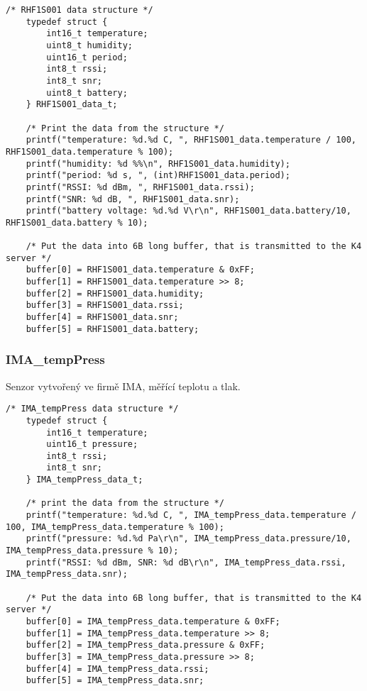 \begin{lstlisting}[style=CStyle]
    /* RHF1S001 data structure */   
    typedef struct {
        int16_t temperature;
        uint8_t humidity;
        uint16_t period;
        int8_t rssi;
        int8_t snr;
        uint8_t battery;
    } RHF1S001_data_t;

    /* Print the data from the structure */
	printf("temperature: %d.%d C, ", RHF1S001_data.temperature / 100, RHF1S001_data.temperature % 100);
	printf("humidity: %d %%\n", RHF1S001_data.humidity);
	printf("period: %d s, ", (int)RHF1S001_data.period);
	printf("RSSI: %d dBm, ", RHF1S001_data.rssi);
	printf("SNR: %d dB, ", RHF1S001_data.snr);
	printf("battery voltage: %d.%d V\r\n", RHF1S001_data.battery/10, RHF1S001_data.battery % 10);

    /* Put the data into 6B long buffer, that is transmitted to the K4 server */
	buffer[0] = RHF1S001_data.temperature & 0xFF;
	buffer[1] = RHF1S001_data.temperature >> 8;
	buffer[2] = RHF1S001_data.humidity;
	buffer[3] = RHF1S001_data.rssi;
	buffer[4] = RHF1S001_data.snr;
	buffer[5] = RHF1S001_data.battery;
\end{lstlisting}


\subsubsection{IMA\_tempPress}
Senzor vytvořený ve firmě IMA, měřící teplotu a tlak.

\begin{lstlisting}[style=CStyle]
    /* IMA_tempPress data structure */   
    typedef struct {
        int16_t temperature;
        uint16_t pressure;
        int8_t rssi;
        int8_t snr;
    } IMA_tempPress_data_t;
    
    /* print the data from the structure */
	printf("temperature: %d.%d C, ", IMA_tempPress_data.temperature / 100, IMA_tempPress_data.temperature % 100);
	printf("pressure: %d.%d Pa\r\n", IMA_tempPress_data.pressure/10, IMA_tempPress_data.pressure % 10);
	printf("RSSI: %d dBm, SNR: %d dB\r\n", IMA_tempPress_data.rssi, IMA_tempPress_data.snr);

    /* Put the data into 6B long buffer, that is transmitted to the K4 server */
	buffer[0] = IMA_tempPress_data.temperature & 0xFF;
	buffer[1] = IMA_tempPress_data.temperature >> 8;
	buffer[2] = IMA_tempPress_data.pressure & 0xFF;
	buffer[3] = IMA_tempPress_data.pressure >> 8;
	buffer[4] = IMA_tempPress_data.rssi;
	buffer[5] = IMA_tempPress_data.snr;
\end{lstlisting}


